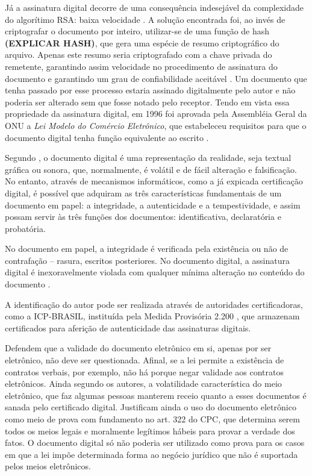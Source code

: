   Já a assinatura digital decorre de uma consequência indesejável
  da complexidade do algorítimo RSA: baixa velocidade
  \cite{ComputerNetworks}. A solução encontrada foi, ao invés de
  criptografar o documento por inteiro, utilizar-se de uma função
  de hash \textbf{(EXPLICAR HASH)}, que gera uma espécie de
  resumo criptográfico do arquivo. Apenas este resumo seria
  criptografado com a chave privada do remetente, garantindo
  assim velocidade no procedimento de assinatura do documento e
  garantindo um grau de confiabilidade
  aceitável \cite{ComputerNetworks}. Um documento que tenha
  passado por esse processo estaria assinado digitalmente pelo
  autor e não poderia ser alterado sem que fosse notado pelo
  receptor. Tendo em vista essa propriedade da assinatura
  digital, em 1996 foi aprovada pela Assembléia Geral da ONU a
  \emph{Lei Modelo do Comércio
  Eletrônico}, que estabeleceu requisitos para que o documento
  digital tenha função equivalente ao escrito
  .

	Segundo , o documento digital é
  uma representação da realidade, seja textual gráfica ou sonora,
  que, normalmente, é volátil e de fácil alteração e
  falsificação. No entanto, através de mecanismos informáticos,
  como a já expicada certificação digital, é possível que
  adquiram as três características fundamentais de um documento
  em papel: a integridade, a autenticidade e a tempestividade, e
  assim possam servir às três funções dos documentos:
  identificativa, declaratória e probatória. \par
	
	No documento em papel, a integridade é verificada pela
  existência ou não de contrafação – rasura, escritos
  posteriores. No documento digital, a assinatura digital é
  inexoravelmente violada com qualquer mínima alteração no
  conteúdo do documento \cite{CertificadoDigital}.\par
	
	A identificação do autor pode ser realizada através de
  autoridades certificadoras, como a ICP-BRASIL, instituída pela
  Medida Provisória 2.200 \cite{MedProv2200}, que armazenam
  certificados para aferição de autenticidade das assinaturas
  digitais. \par
	
	Defendem  que a validade do
  documento eletrônico em si, apenas por ser eletrônico, não deve
  ser questionada.  Afinal, se a lei permite a existência de
  contratos verbais, por exemplo, não há porque negar validade
  aos contratos eletrônicos. Ainda segundo os autores, a
  volatilidade característica do meio eletrônico, que faz algumas
  pessoas manterem receio quanto a esses documentos é sanada pelo
  certificado digital. Justificam ainda o uso do documento
  eletrônico como meio de prova com fundamento no art. 322 do
  CPC, que determina serem todos os meios legais e moralmente
  legítimos hábeis para provar a verdade dos fatos. O documento
  digital só não poderia ser utilizado como prova para os casos
  em que a lei impõe determinada forma ao negócio jurídico que
  não é suportada pelos meios eletrônicos. \par
	
